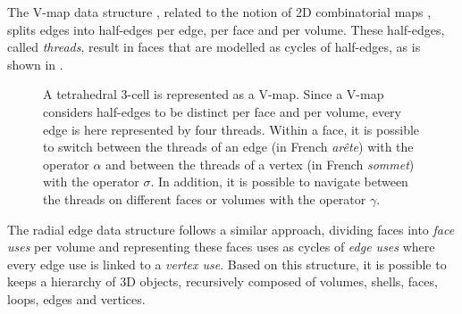 The V-map data structure \citep{Lienhardt88}, related to the notion of 2D combinatorial maps \citep{Edmonds60,Cori75}, splits edges into half-edges per edge, per face and per volume.
These half-edges, called \emph{threads}, result in faces that are modelled as cycles of half-edges, as is shown in .
\begin{figure}[tbp]
\centering
{}
\quad
{}
\caption[A V-map]{A tetrahedral 3-cell is represented as a V-map. Since a V-map considers half-edges to be distinct per face and per volume, every edge is here represented by four threads. Within a face, it is possible to switch between the threads of an edge (in French \emph{ar\^ete}) with the operator $\alpha$ and between the threads of a vertex (in French \emph{sommet}) with the operator $\sigma$. In addition, it is possible to navigate between the threads on different faces or volumes with the operator $\gamma$.}
\label{fig:vmap}
\end{figure}

The radial edge data structure \citep{Weiler88} follows a similar approach, dividing faces into \emph{face uses} per volume and representing these faces uses as cycles of \emph{edge uses} where every edge use is linked to a \emph{vertex use}.
Based on this structure, it is possible to keeps a hierarchy of 3D objects, recursively composed of volumes, shells, faces, loops, edges and vertices.

